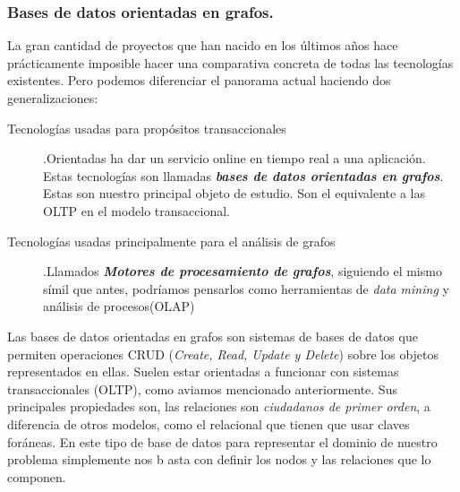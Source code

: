 \documentclass[12pt]{article} %
\begin{document}
\subsubsection{Bases de datos orientadas en grafos.}
La gran cantidad de proyectos que han nacido en los últimos años hace prácticamente imposible hacer una comparativa concreta de todas las tecnologías existentes. Pero podemos diferenciar el panorama actual haciendo dos generalizaciones:
\begin{description}
\item[Tecnologías usadas para propósitos transaccionales].\linebreak Orientadas ha dar un servicio online en tiempo real a una aplicación.
\linebreak Estas tecnologías son llamadas \textbf\textit{bases de datos orientadas en grafos}. Estas son nuestro principal objeto de estudio. Son el equivalente a las OLTP en el modelo transaccional.
\item[Tecnologías usadas principalmente para el análisis de grafos].\linebreak Llamados \textbf\textit{Motores de procesamiento de grafos}, siguiendo el mismo símil que antes, podríamos pensarlos como herramientas de \textit{data mining} y análisis de procesos(OLAP)
\end{description}

\noindent{}

Las bases de datos orientadas en grafos son sistemas de bases de datos que permiten operaciones CRUD (\textit{Create, Read, Update y Delete}) sobre los objetos representados en ellas. Suelen estar orientadas a funcionar con sistemas transaccionales (OLTP), como aviamos mencionado anteriormente. Sus principales propiedades son, las relaciones son \textit{ciudadanos de primer orden}, a diferencia de otros modelos, como el relacional que tienen que usar claves foráneas. En este tipo de base de datos para representar el dominio de nuestro problema simplemente nos b
asta con definir los nodos y las relaciones que lo componen.
\end{document}
